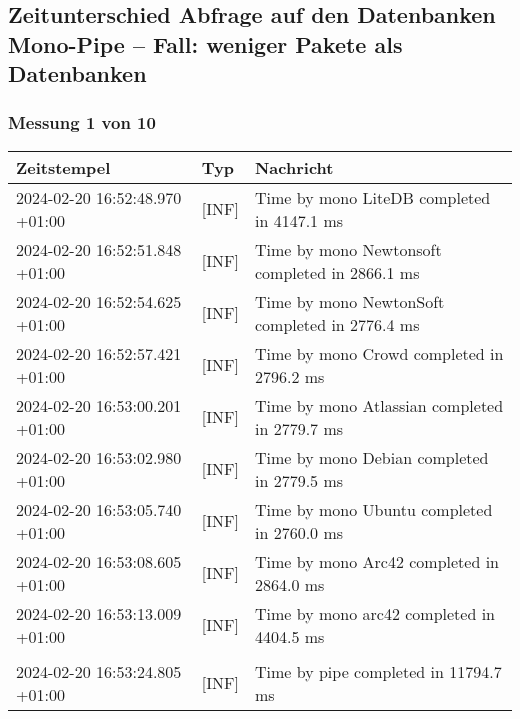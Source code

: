 \subsection{Zeitunterschied Abfrage auf den Datenbanken Mono-Pipe -- Fall: weniger Pakete als Datenbanken} \label{subsec:ZeitunterschiedAbfrageAufDenDatenbankenMonoPipeFallWenigerPaketeAlsDatenbanken}
    \subsubsection{Messung 1 von 10} \label{subsubsec:LiteDbWenigerPaketeAlsDb1von10}
        {
            {\small
                \begin{tabularx}{\textwidth}{|l|l|X|}
                    \hline
                    \textbf{Zeitstempel} & \textbf{Typ} & \textbf{Nachricht} \\
                    \hline
                    \endhead
                    2024-02-20 16:52:48.970 +01:00 & [INF] & Time by mono LiteDB completed in 4147.1 ms \\
                    2024-02-20 16:52:51.848 +01:00 & [INF] & Time by mono Newtonsoft completed in 2866.1 ms \\
                    2024-02-20 16:52:54.625 +01:00 & [INF] & Time by mono NewtonSoft completed in 2776.4 ms \\
                    2024-02-20 16:52:57.421 +01:00 & [INF] & Time by mono Crowd completed in 2796.2 ms \\
                    2024-02-20 16:53:00.201 +01:00 & [INF] & Time by mono Atlassian completed in 2779.7 ms \\
                    2024-02-20 16:53:02.980 +01:00 & [INF] & Time by mono Debian completed in 2779.5 ms \\
                    2024-02-20 16:53:05.740 +01:00 & [INF] & Time by mono Ubuntu completed in 2760.0 ms \\
                    2024-02-20 16:53:08.605 +01:00 & [INF] & Time by mono Arc42 completed in 2864.0 ms \\
                    2024-02-20 16:53:13.009 +01:00 & [INF] & Time by mono arc42 completed in 4404.5 ms \\
                    & & \\
                    2024-02-20 16:53:24.805 +01:00 & [INF] & Time by pipe completed in 11794.7 ms \\
                    \hline
                \end{tabularx}
            }
        }

